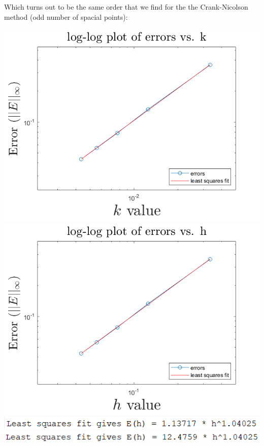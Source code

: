 \documentclass{article}
\begin{document}
Which turns out to be the same order that we find for the the Crank-Nicolson method (odd number of spacial points):
\begin{center}
    \includegraphics[scale = 0.4]{cnerrorkodd.png}
    \includegraphics[scale = 0.4]{cnerrorhodd.png}
    \newline
    \includegraphics[scale = 0.6]{cnorderhodd.PNG}
    \includegraphics[scale = 0.6]{cnorderkodd.PNG}
\end{center}
\end{document}
